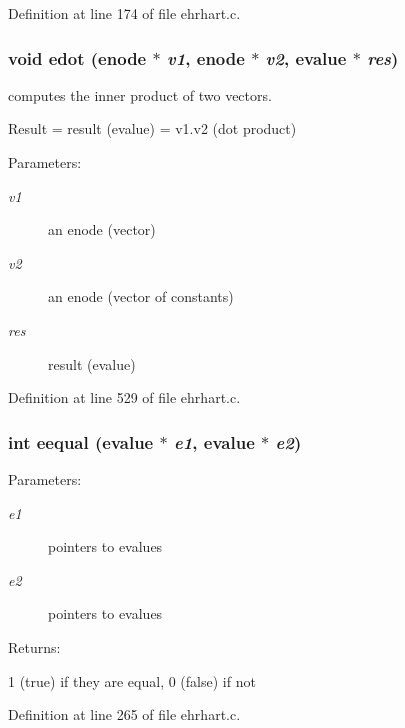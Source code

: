 Definition at line 174 of file ehrhart.c.
\subsubsection{\setlength{\rightskip}{0pt plus 5cm}void edot (enode $\ast$ {\em v1}, enode $\ast$ {\em v2}, evalue $\ast$ {\em res})}\label{ehrhart_8c_a16}


computes the inner product of two vectors.

Result = result (evalue) = v1.v2 (dot product)\begin{Desc}
\item[Parameters: ]\par
\begin{description}
\item[{\em 
v1}]an enode (vector) \item[{\em 
v2}]an enode (vector of constants) \item[{\em 
res}]result (evalue) \end{description}
\end{Desc}


Definition at line 529 of file ehrhart.c.
\subsubsection{\setlength{\rightskip}{0pt plus 5cm}int eequal (evalue $\ast$ {\em e1}, evalue $\ast$ {\em e2})\hspace{0.3cm}{\tt  [static]}}\label{ehrhart_8c_a12}


\begin{Desc}
\item[Parameters: ]\par
\begin{description}
\item[{\em 
e1}]pointers to evalues \item[{\em 
e2}]pointers to evalues \end{description}
\end{Desc}
\begin{Desc}
\item[Returns: ]\par
1 (true) if they are equal, 0 (false) if not \end{Desc}


Definition at line 265 of file ehrhart.c.
